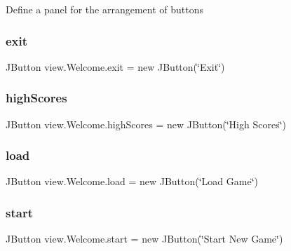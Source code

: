 Define a panel for the arrangement of buttons \hypertarget{classview_1_1_welcome_a5a1ae16f7fb3b7f271353133e58bda15}{}\label{classview_1_1_welcome_a5a1ae16f7fb3b7f271353133e58bda15} 
\subsubsection{\texorpdfstring{exit}{exit}}
{\footnotesize\ttfamily J\+Button view.\+Welcome.\+exit = new J\+Button(\char`\"{}Exit\char`\"{})\hspace{0.3cm}{\ttfamily [private]}}

\hypertarget{classview_1_1_welcome_a824f339b982b2e96f4c6b86287154c5a}{}\label{classview_1_1_welcome_a824f339b982b2e96f4c6b86287154c5a} 
\subsubsection{\texorpdfstring{high\+Scores}{highScores}}
{\footnotesize\ttfamily J\+Button view.\+Welcome.\+high\+Scores = new J\+Button(\char`\"{}High Scores\char`\"{})\hspace{0.3cm}{\ttfamily [private]}}

\hypertarget{classview_1_1_welcome_a91a24fdd828b87e1307d4af30693401e}{}\label{classview_1_1_welcome_a91a24fdd828b87e1307d4af30693401e} 
\subsubsection{\texorpdfstring{load}{load}}
{\footnotesize\ttfamily J\+Button view.\+Welcome.\+load = new J\+Button(\char`\"{}Load Game\char`\"{})\hspace{0.3cm}{\ttfamily [private]}}

\hypertarget{classview_1_1_welcome_a3dfa36fd5db2280f2a2638bacf2d4155}{}\label{classview_1_1_welcome_a3dfa36fd5db2280f2a2638bacf2d4155} 
\subsubsection{\texorpdfstring{start}{start}}
{\footnotesize\ttfamily J\+Button view.\+Welcome.\+start = new J\+Button(\char`\"{}Start New Game\char`\"{})\hspace{0.3cm}{\ttfamily [private]}}

